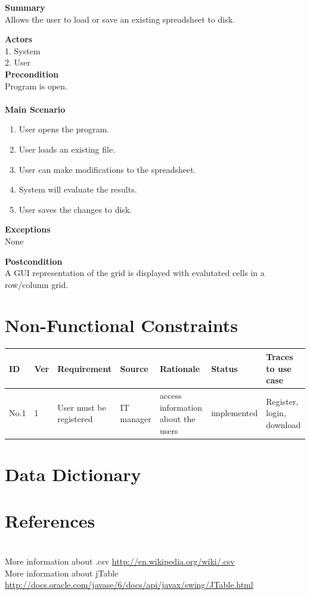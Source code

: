 \documentclass[12pt]{article}
\begin{document}
\noindent
{\bf Summary}\\
Allows the user to load or save an existing spreadsheet to disk.

\noindent
{\bf Actors}\\
1. System\\
2. User \\

\noindent
{\bf Precondition}\\
Program is open.\\
\noindent\\
{\bf Main Scenario}\\
\vspace*{-0.2in}
\begin{enumerate}
\item User opens the program.
\item User loads an existing file.
\item User can make modifications to the spreadsheet.
\item System will evaluate the results.
\item User saves the changes to disk.
\end{enumerate}

\noindent
{\bf Exceptions}\\
None

\noindent
{\bf Postcondition}\\
A GUI representation of the grid is displayed with evalutated cells in a row/column grid.

\clearpage

\section{Non-Functional Constraints}

\begin{tabular}{| l | l | p{3cm} | l | p{3cm} | l | p{3cm} |}
\hline
ID&Ver&Requirement&Source&Rationale&Status&Traces to use case\\\hline
No.1 & 1 & User must be registered & IT manager & access information about the users&implemented&Register, login, download\\\hline

\end{tabular}

\section{Data Dictionary}

\section{References}
\noindent\\
More information about .csv \href{http://en.wikipedia.org/wiki/.csv}{http://en.wikipedia.org/wiki/.csv}\\
More information about jTable \href{http://docs.oracle.com/javase/6/docs/api/javax/swing/JTable.html}{http://docs.oracle.com/javase/6/docs/api/javax/swing/JTable.html}
\end{document}
